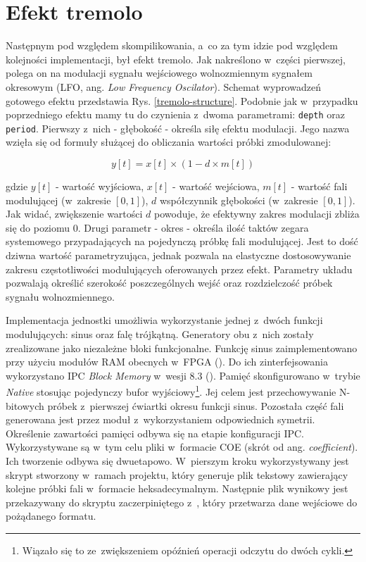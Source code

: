 \section{Efekt tremolo}

Następnym pod względem skompilikowania, a~co za tym idzie pod względem kolejności implementacji, był efekt tremolo. Jak nakreślono w~części pierwszej, polega on na modulacji sygnału wejściowego wolnozmiennym sygnałem okresowym (LFO, ang. \textit{Low Frequency Oscilator}). Schemat wyprowadzeń gotowego efektu przedstawia Rys. \ref{tremolo-structure}. Podobnie jak w~przypadku poprzedniego efektu mamy tu do czynienia z~dwoma parametrami: \verb|depth| oraz \verb|period|. Pierwszy z~nich - głębokość - określa siłę efektu modulacji. Jego nazwa wzięła się od formuły służącej do obliczania wartości próbki zmodulowanej: 

\begin{equation}
    y[t] = x[t] \times (1 - d \times m[t])
\end{equation}

\noindent
gdzie $y[t]$ - wartość wyjściowa, $x[t]$ - wartość wejściowa, $m[t]$ - wartość fali modulującej (w~zakresie $[0,1]$), $d$ współczynnik głębokości (w~zakresie $[0,1]$). Jak widać, zwiększenie wartości $d$ powoduje, że efektywny zakres modulacji zbliża się do poziomu $0$. Drugi parametr - okres - określa ilość taktów zegara systemowego przypadających na pojedynczą próbkę fali modulującej. Jest to dość dziwna wartość parametryzująca, jednak pozwala na elastyczne dostosowywanie zakresu częstotliwości modulujących oferowanych przez efekt. Parametry układu pozwalają określić szerokość poszczególnych wejść oraz rozdzielczość próbek sygnału wolnozmiennego.

Implementacja jednostki umożliwia wykorzystanie jednej z~dwóch funkcji modulujących: sinus oraz falę trójkątną. Generatory obu z~nich zostały zrealizowane jako niezależne bloki funkcjonalne. Funkcję sinus zaimplementowano przy użyciu modułów RAM obecnych w~FPGA (\cite{xilinx_memory_seven}). Do ich zinterfejsowania wykorzystano IPC \textit{Block Memory} w~wesji 8.3 (\cite{xilinx_bram_wizard}). Pamięć skonfigurowano w~trybie \textit{Native} stosując pojedynczy bufor wyjściowy\footnote{Wiązało się to ze~zwiększeniem opóźnień operacji odczytu do dwóch cykli.}. Jej celem jest przechowywanie N-bitowych próbek z~pierwszej ćwiartki okresu funkcji sinus. Pozostała część fali generowana jest przez moduł z~wykorzystaniem odpowiednich symetrii. Określenie zawartości pamięci odbywa się na etapie konfiguracji IPC. Wykorzystywane są w~tym celu pliki w~formacie COE (skrót od ang. \textit{coefficient}). Ich tworzenie odbywa się dwuetapowo. W~pierszym kroku wykorzystywany jest skrypt stworzony w~ramach projektu, który generuje plik tekstowy zawierający kolejne próbki fali w~formacie heksadecymalnym. Następnie plik wynikowy jest przekazywany do skryptu zaczerpiniętego z~\cite{coe_generator}, który przetwarza dane wejściowe do pożądanego formatu.

